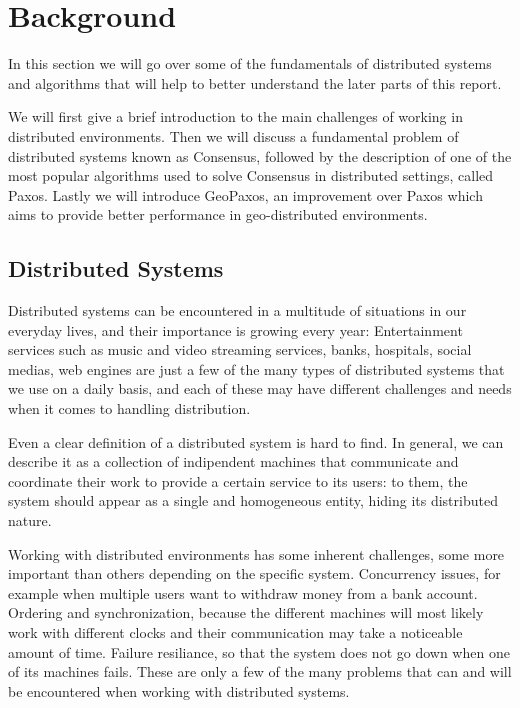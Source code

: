 \chapter{Background}\label{sec:Background}
In this section we will go over some of the fundamentals of distributed systems and algorithms that will help to better understand the later parts of this report.

We will first give a brief introduction to the main challenges of working in distributed environments. Then we will discuss a fundamental problem of distributed systems known as Consensus, followed by the description of one of the most popular algorithms used to solve Consensus in distributed settings, called Paxos. Lastly we will introduce GeoPaxos, an improvement over Paxos which aims to provide better performance in geo-distributed environments.

\section{Distributed Systems}\label{sec:Distributed Systems}

Distributed systems can be encountered in a multitude of situations in our everyday lives, and their importance is growing every year: Entertainment services such as music and video streaming services, banks, hospitals, social medias, web engines are just a few of the many types of distributed systems that we use on a daily basis, and each of these may have different challenges and needs when it comes to handling distribution.

Even a clear definition of a distributed system is hard to find. In general, we can describe it as a collection of indipendent machines that communicate and coordinate their work to provide a certain service to its users: to them, the system should appear as a single and homogeneous entity, hiding its distributed nature.

Working with distributed environments has some inherent challenges, some more important than others depending on the specific system. Concurrency issues, for example when multiple users want to withdraw money from a bank account. Ordering and synchronization, because the different machines will most likely work with different clocks and their communication may take a noticeable amount of time. Failure resiliance, so that the system does not go down when one of its machines fails. These are only a few of the many problems that can and will be encountered when working with distributed systems.

